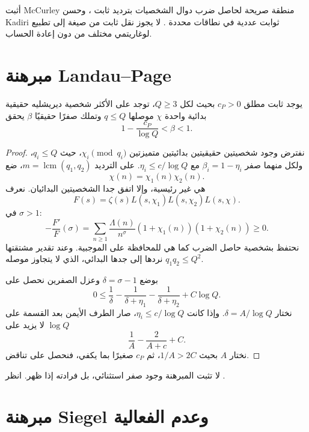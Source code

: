 \begin{remark}
أثبت McCurley منطقة صريحة لحاصل ضرب دوال الشخصيات بترديد ثابت
\cite{McCurley1984}، وحسن Kadiri ثوابت عددية في نطاقات محددة
\cite{Kadiri2018}. لا يجوز نقل ثابت من صيغة إلى تطبيع لوغاريتمي مختلف من
دون إعادة الحساب.
\end{remark}

\section{مبرهنة Landau--Page}

\begin{theorem}
\label{thm:chapter11-landau-page}
\provedhere
يوجد ثابت مطلق \(c_P>0\) بحيث لكل \(Q\ge3\)، توجد على الأكثر شخصية
ديريشليه حقيقية بدائية واحدة \(\chi\) موصلها \(q\le Q\) وتملك صفرًا
حقيقيًا \(\beta\) يحقق
\[
1-\frac{c_P}{\log Q}<\beta<1.
\]
\end{theorem}

\begin{proof}
نفترض وجود شخصيتين حقيقيتين بدائيتين متميزتين
\(\chi_i\pmod{q_i}\)، حيث \(q_i\le Q\)، ولكل منهما صفر
\(\beta_i=1-\eta_i\) مع \(\eta_i\le c/\log Q\). على الترديد
\(m=\operatorname{lcm}(q_1,q_2)\)، ضع
\[
\chi(n)=\chi_1(n)\chi_2(n).
\]
هي غير رئيسية، وإلا اتفق جدا الشخصيتين البدائيان. نعرف
\[
F(s)=\zeta(s)L(s,\chi_1)L(s,\chi_2)L(s,\chi).
\]
في \(\sigma>1\):
\[
-\frac{F'}{F}(\sigma)=
\sum_{n\ge1}\frac{\Lambda(n)}{n^\sigma}
(1+\chi_1(n))(1+\chi_2(n))\ge0.
\]
نحتفظ بشخصية حاصل الضرب كما هي للمحافظة على الموجبية. وعند تقدير مشتقتها
نردها إلى جدها البدائي، الذي لا يتجاوز موصله \(q_1q_2\le Q^2\).

بوضع \(\delta=\sigma-1\) وعزل الصفرين نحصل على
\[
0\le
\frac1\delta-
\frac1{\delta+\eta_1}-
\frac1{\delta+\eta_2}+C\log Q.
\tag{11.5}
\]
نختار \(\delta=A/\log Q\). وإذا كانت
\(\eta_i\le c/\log Q\)، صار الطرف الأيمن بعد القسمة على \(\log Q\) لا
يزيد على
\[
\frac1A-\frac2{A+c}+C.
\]
نختار \(A\) بحيث \(1/A>2C\)، ثم \(c_P\) صغيرًا بما يكفي، فنحصل على
تناقض.
\end{proof}

\begin{remark}
لا تثبت المبرهنة وجود صفر استثنائي، بل فرادته إذا ظهر. انظر
\cite{Davenport2000,BasakPratt2026}.
\end{remark}

\section{مبرهنة Siegel وعدم الفعالية}

